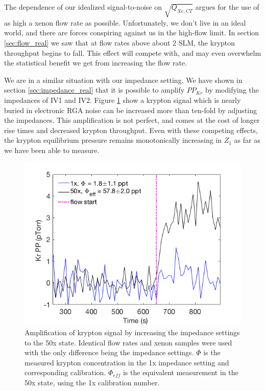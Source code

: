 \documentclass[12pt]{article}
\begin{document}
The dependence of our idealized signal-to-noise on $\sqrt{Q_{Xe,CT}}$ argues for the use of as high a xenon flow rate as possible. Unfortunately, we don't live in an ideal world, and there are forces conspiring against us in the high-flow limit. In section \ref{sec:flow_real} we saw that at flow rates above about 2 SLM, the krypton throughput begins to fall. This effect will compete with, and may even overwhelm the statistical benefit we get from increasing the flow rate.

We are in a similar situation with our impedance setting. We have shown in section \ref{sec:impedance_real} that it is possible to amplify $PP_{Kr}$ by modifying the impedances of IV1 and IV2. Figure \ref{fig:ampimp} show a krypton signal which is nearly buried in electronic RGA noise can be increased more than ten-fold by adjusting the impedances. This amplification is not perfect, and comes at the cost of longer rise times and decreased krypton throughput. Even with these competing effects, the krypton equilibrium pressure remains monotonically increasing in $Z_1$ as far as we have been able to measure.
\begin{figure}[h]
  \includegraphics[width=\linewidth]{Figures/Adjusted_impedance_study.png}
  \caption{Amplification of krypton signal by increasing the impedance settings to the 50x state. Identical flow rates and xenon samples were used with the only difference being the impedance settings. $\Phi$ is the measured krypton concentration in the 1x impedance setting and corresponding calibration. $\Phi_{eff}$ is the equivalent measurement in the 50x state, using the 1x calibration number.  }
  \label{fig:ampimp}
\end{figure}
\end{document}
